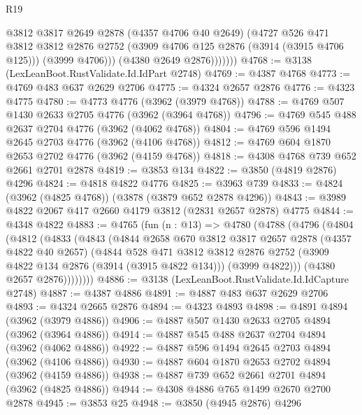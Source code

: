 \begin{lexlean}{R19}
\begin{coremodule}
                  @3812
                  @3817
                  @2649
                  @2878
                  (@4357 @4706 @40 @2649)
                  (@4727
                    @526
                    @471
                    @3812
                    @3812
                    @2876
                    @2752
                    (@3909 @4706 @125 @2876 (@3914 (@3915 @4706 @125)))
                    (@3999 @4706)))
                (@4380 @2649 @2876)))))))
@4768 := @3138 (LexLeanBoot.RustValidate.Id.IdPart @2748)
@4769 := @4387 @4768
@4773 := @4769 @483 @637 @2629 @2706
@4775 := @4324 @2657 @2876
@4776 := @4323 @4775
@4780 := @4773 @4776 (@3962 (@3979 @4768))
@4788 := @4769 @507 @1430 @2633 @2705 @4776 (@3962 (@3964 @4768))
@4796 := @4769 @545 @488 @2637 @2704 @4776 (@3962 (@4062 @4768))
@4804 := @4769 @596 @1494 @2645 @2703 @4776 (@3962 (@4106 @4768))
@4812 := @4769 @604 @1870 @2653 @2702 @4776 (@3962 (@4159 @4768))
@4818 := @4308 @4768 @739 @652 @2661 @2701 @2878
@4819 := @3853 @134
@4822 := @3850 (@4819 @2876) @4296
@4824 := @4818 @4822 @4776
@4825 := @3963 @739
@4833 := @4824 (@3962 (@4825 @4768)) (@3878 (@3879 @652 @2878 @4296))
@4843 := @3989 @4822 @2067 @417 @2660 @4179 @3812 (@2831 @2657 @2878) @4775
@4844 := @4348 @4822
@4883 := @4765
    (fun (n : @13) =>
    @4780
      (@4788
        (@4796
          (@4804
            (@4812
              (@4833
                (@4843
                  (@4844
                    @2658
                    @670
                    @3812
                    @3817
                    @2657
                    @2878
                    (@4357 @4822 @40 @2657)
                    (@4844
                      @528
                      @471
                      @3812
                      @3812
                      @2876
                      @2752
                      (@3909 @4822 @134 @2876 (@3914 (@3915 @4822 @134)))
                      (@3999 @4822)))
                  (@4380 @2657 @2876))))))))
@4886 := @3138 (LexLeanBoot.RustValidate.Id.IdCapture @2748)
@4887 := @4387 @4886
@4891 := @4887 @483 @637 @2629 @2706
@4893 := @4324 @2665 @2876
@4894 := @4323 @4893
@4898 := @4891 @4894 (@3962 (@3979 @4886))
@4906 := @4887 @507 @1430 @2633 @2705 @4894 (@3962 (@3964 @4886))
@4914 := @4887 @545 @488 @2637 @2704 @4894 (@3962 (@4062 @4886))
@4922 := @4887 @596 @1494 @2645 @2703 @4894 (@3962 (@4106 @4886))
@4930 := @4887 @604 @1870 @2653 @2702 @4894 (@3962 (@4159 @4886))
@4938 := @4887 @739 @652 @2661 @2701 @4894 (@3962 (@4825 @4886))
@4944 := @4308 @4886 @765 @1499 @2670 @2700 @2878
@4945 := @3853 @25
@4948 := @3850 (@4945 @2876) @4296

\end{coremodule}
\end{lexlean}
